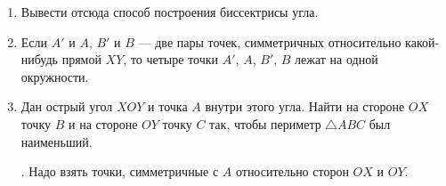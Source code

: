 \documentclass[oneside]{book}
\begin{document}
\begin{enumerate}
 \item
Вывести отсюда способ построения биссектрисы угла.

 \item
Если $A'$ и $A$, $B'$ и $B$ — две пары точек, симметричных относительно какой-нибудь прямой $XY$, то четыре точки $A'$, $A$, $B'$, $B$ лежат на одной окружности.

 \item
Дан острый угол $XOY$ и точка $A$ внутри этого угла.
Найти на стороне $OX$ точку $B$ и на стороне $OY$ точку $C$ так, чтобы периметр $\triangle ABC$ был наименьший.

.
Надо взять точки, симметричные с $A$ относительно сторон $OX$ и $OY$.

\end{enumerate}

\begin{center}
\end{center}
\end{document}
